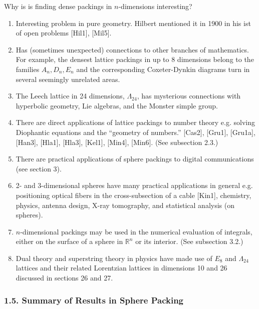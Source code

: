 \documentclass{article}
\newcommand{\R}{\mathbb{R}}
\newcommand{\Leech}{\Lambda_{24}}
\begin{document}
Why is is finding dense packings in $n$-dimensions interesting?
\begin{enumerate}
  \item
  Interesting problem in pure geometry.
  Hilbert mentioned it in 1900 in his ist of open problems [Hil1], [Mil5].

  \item
  Has (sometimes unexpected) connections to other branches of mathematics.
  For example, the densest lattice packings in up to 8 dimensions belong to the families $A_n, D_n, E_n$ and the corresponding Coxeter-Dynkin diagrams turn in several seemingly unrelated areas.

  \item
  The Leech lattice in 24 dimensions, $\Leech$, has mysterious connections with hyperbolic geometry, Lie algebras, and the Monster simple group.

  \item
  There are direct applications of lattice packings to number theory e.g. solving Diophantic equations and the ``geometry of numbers.'' [Cas2], [Gru1], [Gru1a], [Han3], [Hla1], [Hla3], [Kel1], [Min4], [Min6].
  (See subsection 2.3.)

  \item
  There are practical applications of sphere packings to digital communications (see section 3).

  \item
  2- and 3-dimensional spheres have many practical applications in general e.g. positioning optical fibers in the cross-subsection of a cable [Kin1], chemistry, physics, antenna design, X-ray tomography, and statistical analysis (on spheres).

  \item
  $n$-dimensional packings may be used in the numerical evaluation of integrals, either on the surface of a sphere in $\R^n$ or its interior. (See subsection 3.2.)

  \item
  Dual theory and superstring theory in physics have made use of $E_8$ and $\Leech$ lattices and their related Lorentzian lattices in dimensions 10 and 26 discussed in sections 26 and 27.

\end{enumerate}

\subsubsection*{1.5. Summary of Results in Sphere Packing}
\end{document}
